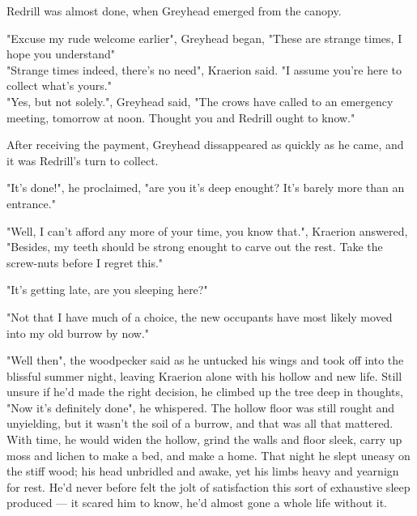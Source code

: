 Redrill was almost done, when Greyhead emerged from the canopy. 

"Excuse my rude welcome earlier", Greyhead began, "These are strange times, I hope you understand"\\

"Strange times indeed, there's no need", Kraerion said. "I assume you're here to collect what's yours."\\

"Yes, but not solely.", Greyhead said, "The crows have called to an emergency meeting, tomorrow at noon. Thought you and Redrill ought to know."

After receiving the payment, Greyhead dissappeared as quickly as he came, and it was Redrill's turn to collect.

"It's done!", he proclaimed, "are you it's deep enought? It's barely more than an entrance."

"Well, I can't afford any more of your time, you know that.", Kraerion answered, "Besides, my teeth should be strong enought to carve out the rest. Take the screw-nuts before I regret this."

"It's getting late, are you sleeping here?"

"Not that I have much of a choice, the new occupants have most likely moved into my old burrow by now."


"Well then", the woodpecker said as he untucked his wings and took off into the blissful summer night, leaving Kraerion alone with his hollow and new life. Still unsure if he'd made the right decision, he climbed up the tree deep in thoughts, "Now it's definitely done", he whispered. The hollow floor was still rought and unyielding, but it wasn't the soil of a burrow, and that was all that mattered. With time, he would widen the hollow, grind the walls and floor sleek, carry up moss and lichen to make a bed, and make a home. That night he slept uneasy on the stiff wood; his head unbridled and awake, yet his limbs heavy and yearnign for rest. He'd never before felt the jolt of satisfaction this sort of exhaustive sleep produced — it scared him to know, he'd almost gone a whole life without it.



